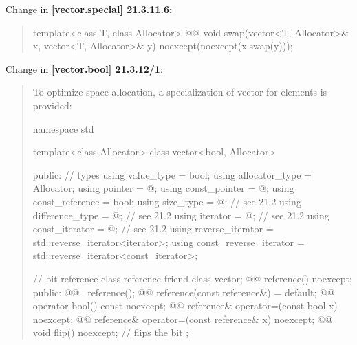 \documentclass{wg21}
\begin{document}
Change in \textbf{[vector.special] 21.3.11.6}:
\begin{quote}
\begin{itemdecl}
template<class T, class Allocator>
  @@ void swap(vector<T, Allocator>& x, vector<T, Allocator>& y)
    noexcept(noexcept(x.swap(y)));
\end{itemdecl}
\end{quote}

Change in \textbf{[vector.bool] 21.3.12/1}:
\begin{quote}
To optimize space allocation, a specialization of vector for 
elements is provided:

\begin{codeblock}
namespace std {
  template<class Allocator>
  class vector<bool, Allocator> {
  public:
    // types
    using value_type             = bool;
    using allocator_type         = Allocator;
    using pointer                = @\impdef@;
    using const_pointer          = @\impdef@;
    using const_reference        = bool;
    using size_type              = @\impdef@; // see 21.2
    using difference_type        = @\impdef@; // see 21.2
    using iterator               = @\impdef@; // see 21.2
    using const_iterator         = @\impdef@; // see 21.2
    using reverse_iterator       = std::reverse_iterator<iterator>;
    using const_reverse_iterator = std::reverse_iterator<const_iterator>;

    // bit reference
    class reference {
      friend class vector;
      @@ reference() noexcept;
    public:
      @@ ~reference();
      @@ reference(const reference&) = default;
      @@ operator bool() const noexcept;
      @@ reference& operator=(const bool x) noexcept;
      @@ reference& operator=(const reference& x) noexcept;
      @@ void flip() noexcept;     // flips the bit
    };

}}
\end{codeblock}
\end{quote}
\end{document}
